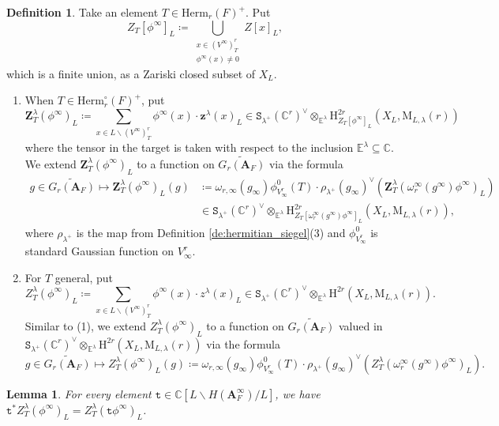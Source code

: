 \documentclass[12pt]{amsart}
\numberwithin{equation}{section}
\theoremstyle{plain}
\newtheorem{lem}[proposition]{Lemma}
\theoremstyle{definition}
\newtheorem{definition}[proposition]{Definition}
\theoremstyle{remark}
\renewcommand{\b}[1]{\mathbf{#1}}
\renewcommand{\d}[1]{\mathbb{#1}}
\renewcommand{\r}[1]{\mathrm{#1}}
\renewcommand{\(}{\left(}
\renewcommand{\)}{\right)}
\newcommand{\bA}{\b A}
\newcommand{\dC}{\d C}
\newcommand{\dE}{\d E}
\newcommand{\rH}{\r H}
\newcommand{\rM}{\r M}
\newcommand{\tS}{\mathtt{S}}
\renewcommand{\tt}{\mathtt{t}}
\newcommand{\bbz}{\boldsymbol{z}}
\newcommand{\bbZ}{\boldsymbol{Z}}
\newcommand{\Herm}{\r{Herm}}
\begin{document}
\begin{definition}\label{de:special_cycle}
Take an element $T\in\Herm_r(F)^+$. Put
\[
Z_T[\phi^\infty]_L\coloneqq\bigcup_{\substack{x\in (V^\infty)^r_T\\ \phi^\infty(x)\neq 0}}Z[x]_L,
\]
which is a finite union, as a Zariski closed subset of $X_L$.
\begin{enumerate}
  \item When $T\in\Herm_r^\circ(F)^+$, put
      \[
      \bbZ^\lambda_T(\phi^\infty)_L\coloneqq\sum_{x\in L\backslash (V^\infty)^r_T} \phi^\infty(x)\cdot \bbz^\lambda(x)_L\in\tS_{\lambda^+}(\dC^r)^\vee\otimes_{\dE^\lambda}\rH^{2r}_{Z_T[\phi^\infty]_L}(X_L,\rM_{L,\lambda}(r))
      \]
      where the tensor in the target is taken with respect to the inclusion $\dE^\lambda\subseteq\dC$. We extend $\bbZ^\lambda_T(\phi^\infty)_L$ to a function on $\widetilde{G_r(\bA_F)}$ via the formula
      \begin{align*}
      g\in\widetilde{G_r(\bA_F)}\mapsto
      \bbZ^\lambda_T(\phi^\infty)_L(g)&\coloneqq\omega_{r,\infty}(g_\infty)\phi^0_{V_\infty^r}(T) \cdot\rho_{\lambda^+}(g_\infty)^\vee\(\bbZ^\lambda_T(\omega_r^\infty(g^\infty)\phi^\infty)_L\)\\
      &\in\tS_{\lambda^+}(\dC^r)^\vee\otimes_{\dE^\lambda}
      \rH^{2r}_{Z_T[\omega_r^\infty(g^\infty)\phi^\infty]_L}(X_L,\rM_{L,\lambda}(r)),
      \end{align*}
      where $\rho_{\lambda^+}$ is the map from Definition \ref{de:hermitian_siegel}(3) and $\phi^0_{V_\infty^r}$ is standard Gaussian function on $V_\infty^r$.

  \item For $T$ general, put
      \[
      Z^\lambda_T(\phi^\infty)_L\coloneqq\sum_{x\in L\backslash (V^\infty)^r_T} \phi^\infty(x)\cdot z^\lambda(x)_L\in\tS_{\lambda^+}(\dC^r)^\vee\otimes_{\dE^\lambda}\rH^{2r}(X_L,\rM_{L,\lambda}(r)).
      \]
      Similar to (1), we extend $Z^\lambda_T(\phi^\infty)_L$ to a function on $\widetilde{G_r(\bA_F)}$ valued in $\tS_{\lambda^+}(\dC^r)^\vee\otimes_{\dE^\lambda}\rH^{2r}(X_L,\rM_{L,\lambda}(r))$ via the formula
      \[
      g\in\widetilde{G_r(\bA_F)}\mapsto
      Z^\lambda_T(\phi^\infty)_L(g)\coloneqq\omega_{r,\infty}(g_\infty)\phi^0_{V_\infty^r}(T) \cdot\rho_{\lambda^+}(g_\infty)^\vee\(Z^\lambda_T(\omega_r^\infty(g^\infty)\phi^\infty)_L\).
      \]
\end{enumerate}
\end{definition}


\begin{lem}\label{le:hecke_translate}
For every element $\tt\in\dC[L\backslash H(\bA_F^\infty)/L]$, we have $\tt^*Z^\lambda_T(\phi^\infty)_L=Z^\lambda_T(\tt\phi^\infty)_L$.
\end{lem}
\end{document}
